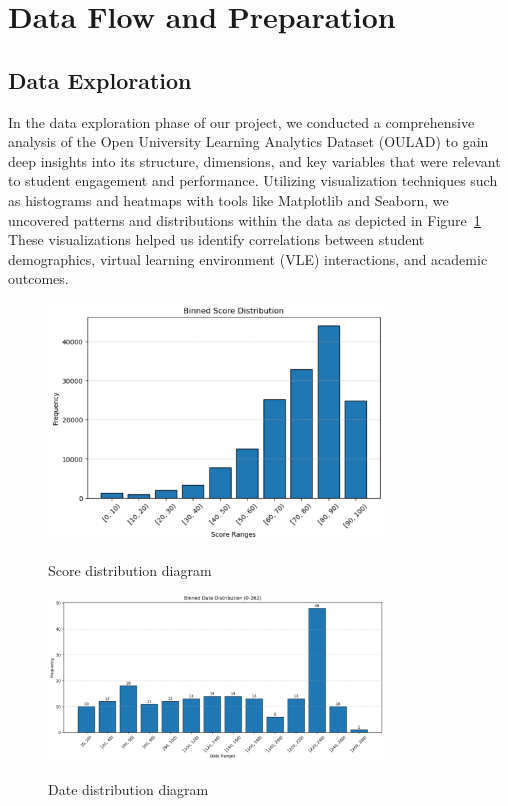 \section{Data Flow and Preparation}

\subsection*{Data Exploration}
In the data exploration phase of our project, we conducted a comprehensive analysis of the Open University Learning Analytics Dataset (OULAD) to gain deep insights into its structure, dimensions, and key variables that were relevant to student engagement and performance. Utilizing visualization techniques such as histograms and heatmaps with tools like Matplotlib and Seaborn, we uncovered patterns and distributions within the data as depicted in Figure~\ref{distribution} These visualizations helped us identify correlations between student demographics, virtual learning environment (VLE) interactions, and academic outcomes.

\begin{figure}
  \begin{center}
  \includegraphics[width=3.5in]{photo/distrib.PNG}\\
  \caption{Score distribution diagram}
  \label{distribution}
  \end{center}
\end{figure}

\begin{figure}
  \begin{center}
  \includegraphics[width=3.5in]{photo/uniformdate.PNG}\\
  \caption{Date distribution diagram}
  \label{unidate}
  \end{center}
\end{figure}

